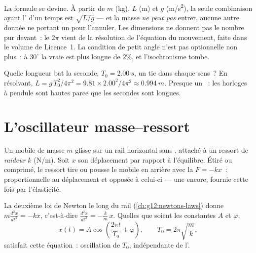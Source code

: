 \begin{remark}\label{rem:g12:oscillators-and-time:dimensional}
La formule se devine. À partir de $m$ (\unit{kg}), $L$ (\unit{m}) et
$g$ (\unit{m/s^2}), la seule combinaison ayant l' d'un temps est
$\sqrt{L/g}$ --- et la masse \emph{ne peut pas} entrer, aucune autre
donnée ne portant un  pour l'annuler. Les dimensions ne
donnent pas le nombre pur devant~: le $2\pi$ vient de la résolution de
l'équation du mouvement, faite dans le volume de Licence~1. La
condition de petit angle n'est pas optionnelle non plus~: à $30^\circ$
la vraie  est plus longue de $2\%$, et l'isochronisme
tombe.
\end{remark}

\begin{example}\label{ex:g12:oscillators-and-time:seconds}
Quelle longueur bat la seconde, $T_0 = \qty{2.00}{s}$, un tic dans
chaque sens~? En résolvant, $L = g\,T_0^2/4\pi^2 = 9.81 \times
2.00^2/4\pi^2 \approx \qty{0.994}{m}$. Presque un ~: les
horloges à pendule sont hautes parce que les secondes sont longues.
\end{example}

\section{L'oscillateur masse--ressort}

\begin{definition}\label{def:g12:oscillators-and-time:spring}
Un mobile de masse $m$ glisse sur un rail horizontal sans ,
attaché à un ressort de \emph{raideur} $k$
(\unit{N/m}). Soit $x$ son déplacement par rapport à l'équilibre.
Étiré ou comprimé, le ressort tire ou pousse le mobile en arrière
avec la  $F = -kx$~: proportionnelle au déplacement et
opposée à celui-ci --- une  encore, fournie
cette fois par l'élasticité.
\end{definition}

\begin{proposition}\label{prop:g12:oscillators-and-time:spring-period}
La deuxième loi de Newton le long du rail
(\cref{ch:g12:newtons-laws}) donne $m \frac{d^2x}{dt^2} = -kx$,
c'est-à-dire $\frac{d^2x}{dt^2} = -\frac{k}{m}\,x$. Quelles que
soient les constantes $A$ et $\varphi$,
\[
x(t) = A \cos\!\left(\frac{2\pi t}{T_0} + \varphi\right),
\qquad T_0 = 2\pi\sqrt{\frac{m}{k}},
\]
satisfait cette équation~: oscillation de  $T_0$,
indépendante de l'.
\end{proposition}

